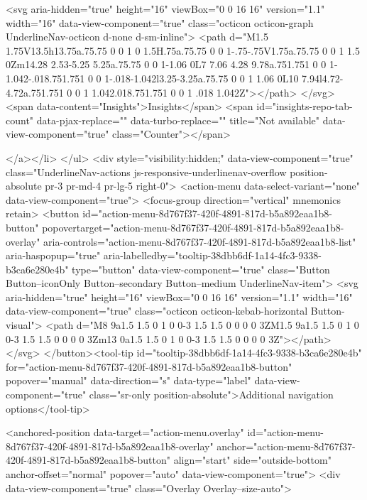               <svg aria-hidden="true" height="16" viewBox="0 0 16 16" version="1.1" width="16" data-view-component="true" class="octicon octicon-graph UnderlineNav-octicon d-none d-sm-inline">
    <path d="M1.5 1.75V13.5h13.75a.75.75 0 0 1 0 1.5H.75a.75.75 0 0 1-.75-.75V1.75a.75.75 0 0 1 1.5 0Zm14.28 2.53-5.25 5.25a.75.75 0 0 1-1.06 0L7 7.06 4.28 9.78a.751.751 0 0 1-1.042-.018.751.751 0 0 1-.018-1.042l3.25-3.25a.75.75 0 0 1 1.06 0L10 7.94l4.72-4.72a.751.751 0 0 1 1.042.018.751.751 0 0 1 .018 1.042Z"></path>
</svg>
        <span data-content="Insights">Insights</span>
          <span id="insights-repo-tab-count" data-pjax-replace="" data-turbo-replace="" title="Not available" data-view-component="true" class="Counter"></span>


    
</a></li>
</ul>
    <div style="visibility:hidden;" data-view-component="true" class="UnderlineNav-actions js-responsive-underlinenav-overflow position-absolute pr-3 pr-md-4 pr-lg-5 right-0">      <action-menu data-select-variant="none" data-view-component="true">
  <focus-group direction="vertical" mnemonics retain>
    <button id="action-menu-8d767f37-420f-4891-817d-b5a892eaa1b8-button" popovertarget="action-menu-8d767f37-420f-4891-817d-b5a892eaa1b8-overlay" aria-controls="action-menu-8d767f37-420f-4891-817d-b5a892eaa1b8-list" aria-haspopup="true" aria-labelledby="tooltip-38dbb6df-1a14-4fc3-9338-b3ca6e280e4b" type="button" data-view-component="true" class="Button Button--iconOnly Button--secondary Button--medium UnderlineNav-item">  <svg aria-hidden="true" height="16" viewBox="0 0 16 16" version="1.1" width="16" data-view-component="true" class="octicon octicon-kebab-horizontal Button-visual">
    <path d="M8 9a1.5 1.5 0 1 0 0-3 1.5 1.5 0 0 0 0 3ZM1.5 9a1.5 1.5 0 1 0 0-3 1.5 1.5 0 0 0 0 3Zm13 0a1.5 1.5 0 1 0 0-3 1.5 1.5 0 0 0 0 3Z"></path>
</svg>
</button><tool-tip id="tooltip-38dbb6df-1a14-4fc3-9338-b3ca6e280e4b" for="action-menu-8d767f37-420f-4891-817d-b5a892eaa1b8-button" popover="manual" data-direction="s" data-type="label" data-view-component="true" class="sr-only position-absolute">Additional navigation options</tool-tip>


<anchored-position data-target="action-menu.overlay" id="action-menu-8d767f37-420f-4891-817d-b5a892eaa1b8-overlay" anchor="action-menu-8d767f37-420f-4891-817d-b5a892eaa1b8-button" align="start" side="outside-bottom" anchor-offset="normal" popover="auto" data-view-component="true">
  <div data-view-component="true" class="Overlay Overlay--size-auto">
    

